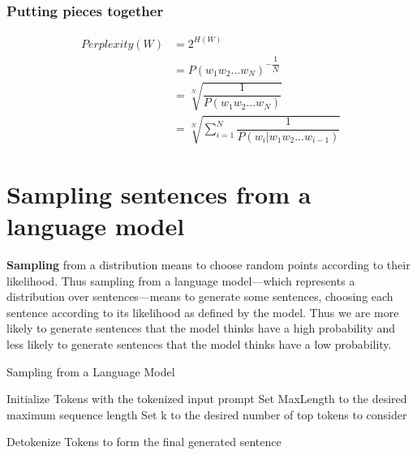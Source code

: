 \subsubsection*{Putting pieces together}
\begin{align*}
    Perplexity(W)       
        &= 2^{H(W)}    \\ 
        &= P(w_1w_2...w_N)^{-\dfrac{1}{N}} \\ 
        &= \sqrt[N]{\dfrac{1}{P(w_1w_2...w_N)}} \\ 
        &= \sqrt[N]{\sum_{i=1}^{N} \dfrac{1}{P(w_i|w_1w_2...w_{i-1})}} 
\end{align*}





\section{Sampling sentences from a language model \cite{nlp-1}}

\textbf{Sampling} from a distribution means to choose random points according to their likelihood. Thus sampling from a language model—which represents a distribution over sentences—means to generate some sentences, choosing each sentence according to its likelihood as defined by the model. Thus we are more likely to generate sentences that the model thinks have a high probability and less likely to generate sentences that the model thinks have a low probability.

\begin{algorithm}
    \caption{Sampling from a Language Model}
    Initialize Tokens with the tokenized input prompt\;
    Set MaxLength to the desired maximum sequence length\;
    Set k to the desired number of top tokens to consider\;
    
    
    Detokenize Tokens to form the final generated sentence\;
\end{algorithm}


